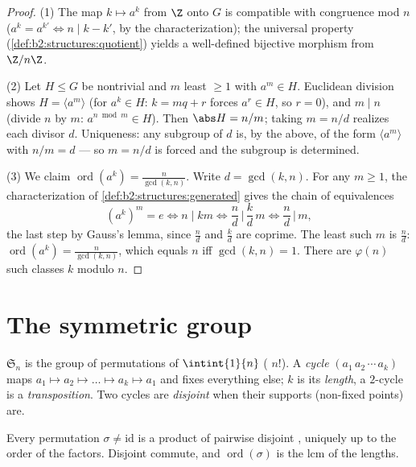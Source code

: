 \begin{proof}
(1) The map $k \mapsto a^k$ from $\Z$ onto $G$ is compatible with
congruence mod $n$ ($a^{k} = a^{k'} \iff n \mid k - k'$, by the 
characterization); the universal property
(\cref{def:b2:structures:quotient}) yields a well-defined bijective
morphism from $\Z/n\Z$.

(2) Let $H \leq G$ be nontrivial and $m$ least $\geq 1$ with $a^m \in
H$. Euclidean division shows $H = \langle a^m\rangle$ (for $a^k \in
H$: $k = mq + r$ forces $a^r \in H$, so $r = 0$), and $m \mid n$
(divide $n$ by $m$: $a^{n \bmod m} \in H$). Then $\abs H = n/m$;
taking $m = n/d$ realizes each divisor $d$. Uniqueness: any subgroup
of  $d$ is, by the above, of the form $\langle a^m \rangle$
with $n/m = d$ --- so $m = n/d$ is forced and the subgroup is
determined.

(3) We claim $\operatorname{ord}(a^k) = \frac{n}{\gcd(k, n)}$.
Write $d = \gcd(k, n)$. For any $m \geq 1$, the 
characterization of \cref{def:b2:structures:generated} gives the
chain of equivalences
\[
(a^k)^m = e
\iff n \mid km
\iff \frac{n}{d} \,\Big|\, \frac{k}{d}\,m
\iff \frac{n}{d} \,\Big|\, m ,
\]
the last step by Gauss's lemma, since $\frac nd$ and $\frac kd$
are coprime. The least such $m$ is $\frac nd$:
$\operatorname{ord}(a^k) = \frac n{\gcd(k,n)}$, which equals $n$
iff $\gcd(k, n) = 1$. There are $\varphi(n)$ such classes $k$
modulo $n$.
\end{proof}

\section{The symmetric group}

\begin{definition}\label{def:b2:structures:sn}
$\mathfrak{S}_n$ is the group of permutations of $\intint{1}{n}$
( $n!$). A \emph{cycle} $(a_1\,a_2\,\cdots\,a_k)$
maps $a_1 \mapsto a_2 \mapsto \dots \mapsto a_k \mapsto a_1$ and
fixes everything else; $k$ is its \emph{length}, a $2$-cycle is a
\emph{transposition}. Two cycles are
\emph{disjoint} when their
supports (non-fixed points) are.
\end{definition}

\begin{theorem}\label{thm:b2:structures:cycles}
Every permutation $\sigma \neq \mathrm{id}$ is a product of pairwise
disjoint , uniquely up to the order of the factors. Disjoint
 commute, and $\operatorname{ord}(\sigma)$ is the lcm of the
lengths.
\end{theorem}


